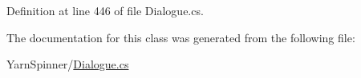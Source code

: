 Definition at line 446 of file Dialogue.\-cs.



The documentation for this class was generated from the following file\-:\begin{DoxyCompactItemize}
\item 
Yarn\-Spinner/\hyperlink{a00296}{Dialogue.\-cs}\end{DoxyCompactItemize}
